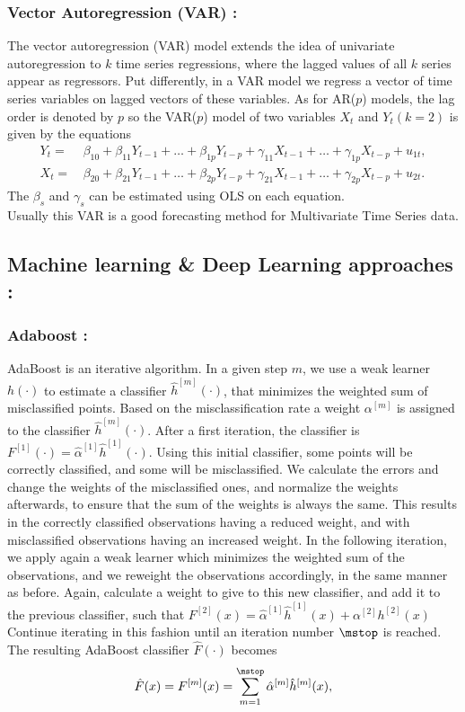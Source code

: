 \subsubsection{Vector Autoregression (VAR) : }
The vector autoregression \cite{var} (VAR) model extends the idea of univariate autoregression to $k$ time series regressions, where the lagged values of all $k$ series appear as regressors. Put differently, in a VAR model we regress a vector of time series variables on lagged vectors of these variables. As for AR($p$) models, the lag order is denoted by $p$ so the VAR($p$) model of two variables $X_{t}$ and $Y_{t}(k=2)$ is given by the equations  
\begin{align*}
  Y_t =& \, \beta_{10} + \beta_{11} Y_{t-1} + \dots + \beta_{1p} Y_{t-p} + \gamma_{11} X_{t-1} + \dots + \gamma_{1p} X_{t-p} + u_{1t}, \\
  X_t =& \, \beta_{20} + \beta_{21} Y_{t-1} + \dots + \beta_{2p} Y_{t-p} + \gamma_{21} X_{t-1} + \dots + \gamma_{2p} X_{t-p} + u_{2t}.
\end{align*}
The $\beta_{s}$ and  $\gamma_{s}$ can be estimated using OLS on each equation.\\Usually this VAR is a good forecasting method for Multivariate Time Series data.

\subsection{Machine learning \& Deep Learning approaches :}


\subsubsection{Adaboost :}


AdaBoost \cite{adaboost}is an iterative algorithm.
In a given step $m$, we use a weak learner $h(\cdot)$ to estimate a classifier $\hat{h}^{[m]}(\cdot)$, that minimizes the weighted sum of misclassified points.
Based on the misclassification rate a weight $\alpha^{[m]}$ is assigned to the classifier $\hat{h}^{[m]}(\cdot)$.
After a first iteration, the classifier is $F^{[1]}(\cdot)=\hat{\alpha}^{[1]}\hat{h}^{[1]}(\cdot)$.
Using this initial classifier, some points will be correctly classified, and some will be misclassified.
We calculate the errors and change the weights of the misclassified ones, and normalize the weights afterwards, to ensure that the sum of the weights is always the same.
This results in the correctly classified observations having a reduced weight, and with misclassified observations having an increased weight.
In the following iteration, we apply again a weak learner which minimizes the weighted sum of the observations, and we reweight the observations accordingly, in the same manner as before.
Again, calculate a weight to give to this new classifier, and add it to the previous classifier, such that $F^{[2]}(x)=\hat{\alpha}^{[1]}\hat{h}^{[1]}(x)+\alpha^{[2]}h^{[2]}(x)$
Continue iterating in this fashion until an iteration number $\mstop$ is reached.
The resulting AdaBoost classifier $\hat{F}(\cdot)$ becomes
\begin{equation*}
    \hat{F}(x)=F^{[m]}(x)=\sum_{m=1}^{\mstop}\hat{\alpha}^{[m]}\hat{h}^{[m]}(x),
\end{equation*}

